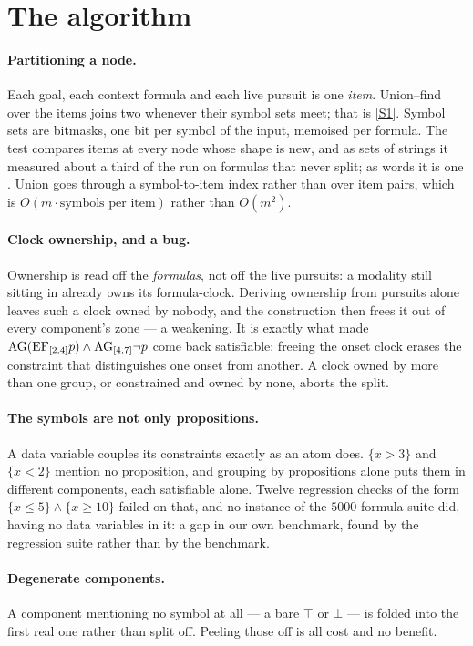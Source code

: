 \section{The algorithm}
\label{sec:algorithm}

\paragraph{Partitioning a node.} Each goal, each context formula and each live
pursuit is one \emph{item}. Union--find over the items joins two whenever their
symbol sets meet; that is \ref{S1}. Symbol sets are bitmasks, one bit per symbol
of the input, memoised per formula. The test compares items at every node whose
shape is new, and as sets of strings it measured about a third of the run on
formulas that never split; as words it is one \code{\&}. Union goes through a
symbol-to-item index rather than over item pairs, which is
$O(m\cdot\text{symbols per item})$ rather than $O(m^{2})$.

\paragraph{Clock ownership, and a bug.} Ownership is read off the
\emph{formulas}, not off the live pursuits: a modality still sitting in \Gam
already owns its formula-clock. Deriving ownership from pursuits alone leaves
such a clock owned by nobody, and the construction then frees it out of every
component's zone --- a weakening. It is exactly what made
$\mathrm{AG}(\mathrm{EF}_{[2,4]}p)\wedge\mathrm{AG}_{[4,7]}\neg p$ come back satisfiable: freeing the
onset clock erases the constraint that distinguishes one onset from another. A
clock owned by more than one group, or constrained and owned by none, aborts the
split.

\paragraph{The symbols are not only propositions.} A data variable couples its
constraints exactly as an atom does. $\{x>3\}$ and $\{x<2\}$ mention no
proposition, and grouping by propositions alone puts them in different
components, each satisfiable alone. Twelve regression checks of the form
$\{x\le 5\}\wedge\{x\ge 10\}$ failed on that, and no instance of the $5000$-formula
suite did, having no data variables in it: a gap in our own benchmark, found by
the regression suite rather than by the benchmark.

\paragraph{Degenerate components.} A component mentioning no symbol at all --- a
bare $\top$ or $\bot$ --- is folded into the first real one rather than split
off. Peeling those off is all cost and no benefit.

